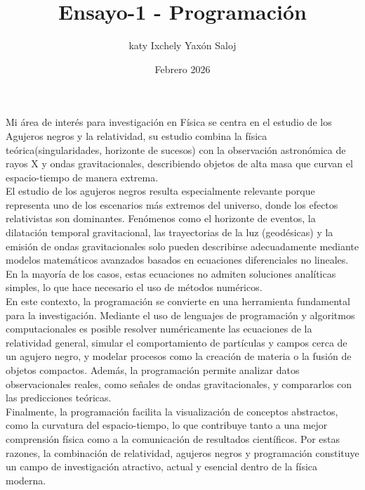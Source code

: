 \documentclass{article}
\title{Ensayo-1 - Programación}
\author{katy Ixchely Yaxón Saloj}
\date{Febrero 2026}
\begin{document}
\maketitle
Mi área de interés para investigación en Física se centra en el estudio de los Agujeros negros y la relatividad, su estudio combina la física teórica(singularidades, horizonte de sucesos) con la observación astronómica de rayos X y ondas gravitacionales, describiendo objetos de alta masa que curvan el espacio-tiempo de manera extrema.\\


El estudio de los agujeros negros resulta especialmente relevante porque representa uno de los escenarios más extremos del universo, donde los efectos relativistas son dominantes. Fenómenos como el horizonte de eventos, la dilatación temporal gravitacional, las trayectorias de la luz (geodésicas) y la emisión de ondas gravitacionales solo pueden describirse adecuadamente mediante modelos matemáticos avanzados basados en ecuaciones diferenciales no lineales. En la mayoría de los casos, estas ecuaciones no admiten soluciones analíticas simples, lo que hace necesario el uso de métodos numéricos.\\

En este contexto, la programación se convierte en una herramienta fundamental para la investigación. Mediante el uso de lenguajes de programación y algoritmos computacionales es posible resolver numéricamente las ecuaciones de la relatividad general, simular el comportamiento de partículas y campos cerca de un agujero negro, y modelar procesos como la creación de materia o la fusión de objetos compactos. Además, la programación permite analizar datos observacionales reales, como señales de ondas gravitacionales, y compararlos con las predicciones teóricas.\\

Finalmente, la programación facilita la visualización de conceptos abstractos, como la curvatura del espacio-tiempo, lo que contribuye tanto a una mejor comprensión física como a la comunicación de resultados científicos. Por estas razones, la combinación de relatividad, agujeros negros y programación constituye un campo de investigación atractivo, actual y esencial dentro de la física moderna.\\
\end{document}
